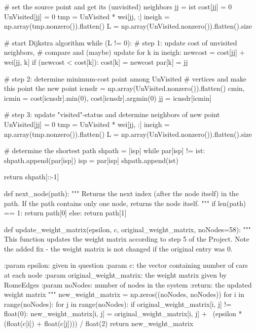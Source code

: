 \documentclass[paper=a4, fontsize=12pt]{scrartcl} %
\numberwithin{equation}{section}       %
\numberwithin{figure}{section}         %
\numberwithin{table}{section}          %
\begin{document}
\begin{python}
    # set the source point and get its (unvisited) neighbors
    jj = ist
    cost[jj] = 0
    UnVisited[jj] = 0
    tmp = UnVisited * wei[jj, :]
    ineigh = np.array(tmp.nonzero()).flatten()
    L = np.array(UnVisited.nonzero()).flatten().size

    # start Dijkstra algorithm
    while (L != 0):
        # step 1: update cost of unvisited neighbors,
        #         compare and (maybe) update
        for k in ineigh:
            newcost = cost[jj] + wei[jj, k]
            if (newcost < cost[k]):
                cost[k] = newcost
                par[k] = jj

        # step 2: determine minimum-cost point among UnVisited
        #         vertices and make this point the new point
        icnsdr = np.array(UnVisited.nonzero()).flatten()
        cmin, icmin = cost[icnsdr].min(0), cost[icnsdr].argmin(0)
        jj = icnsdr[icmin]

        # step 3: update "visited"-status and determine neighbors of new point
        UnVisited[jj] = 0
        tmp = UnVisited * wei[jj, :]
        ineigh = np.array(tmp.nonzero()).flatten()
        L = np.array(UnVisited.nonzero()).flatten().size

    # determine the shortest path
    shpath = [isp]
    while par[isp] != ist:
        shpath.append(par[isp])
        isp = par[isp]
    shpath.append(ist)

    return shpath[::-1]

def next_node(path):
    """ Returns the next index (after the node itself) in the path.
        If the path contains only one node, returns the node itself.
    """
    if len(path) == 1:
        return path[0]
    else:
        return path[1]


def update_weight_matrix(epsilon, c, original_weight_matrix, noNodes=58):
    """
    This function updates the weight matrix according to step 5 of the
    Project. Note the added fix - the weight matrix is not changed if
    the original entry was 0.



    :param epsilon: given in question
    :param c: the vector containing number of cars at each node
    :param original_weight_matrix: the weight matrix given by RomeEdges
    :param noNodes: number of nodes in the system
    :return: the updated weight matrix
    """
    new_weight_matrix = np.zeros((noNodes, noNodes))
    for i in range(noNodes):
        for j in range(noNodes):
            if original_weight_matrix[i, j] != float(0):
                new_weight_matrix[i, j] = original_weight_matrix[i, j] + \
                                          (epsilon * (float(c[i]) +
                                                      float(c[j]))) / float(2)
    return new_weight_matrix



\end{python}
\end{document}
